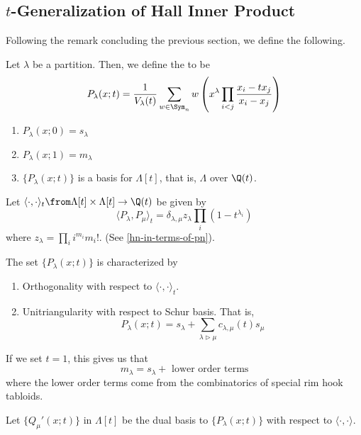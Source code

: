 \documentclass[11pt,leqno,oneside]{amsart}
\numberwithin{thm}{section}
\newcommand{\strictlydominates}{\mathrel{\rhd}}
\newcommand{\sym}{\Lambda}
\begin{document}
\subsection{\(t\)-Generalization of Hall Inner Product}
Following the remark concluding the previous section, we define the
following.
\begin{defn}
  Let \(\lambda\) be a partition. Then, we define the
   to be \[
    P_\lambda(x;t) = \frac{1}{V_\lambda(t)} \sum_{w \in \Sym_n} w
    \left( x^\lambda \prod_{i < j} \frac{x_i-tx_j}{x_i-x_j}\right)
  \]
\end{defn}
\begin{prop}
  \begin{enumerate}
  \item \(P_\lambda(x;0) = s_\lambda\)
  \item \(P_\lambda(x;1) = m_\lambda\)
  \item \(\{P_\lambda(x;t)\}\) is a basis for \(\sym[t]\), that is,
    \(\sym\) over \(\Q(t)\). 
  \end{enumerate}
\end{prop}
\begin{defn}
  Let \(\langle \cdot, \cdot \rangle_t \from \sym[t] \times \sym[t]
  \to \Q(t)\) be given by \[
    \langle P_\lambda, P_\mu \rangle_t = \delta_{\lambda,\mu}
    z_\lambda \prod_{i} (1-t^{\lambda_i})
  \]
  where \(z_\lambda = \prod_i i^{m_i} m_i!\). (See
  \ref{hn-in-terms-of-pn}). 
\end{defn}
\begin{prop}
  The set \(\{P_\lambda(x;t)\}\) is characterized by
  \begin{enumerate}
  \item Orthogonality with respect to \(\langle \cdot, \cdot
    \rangle_t\).
  \item Unitriangularity with respect to Schur basis. That is, \[
      P_\lambda(x;t) = s_\lambda + \sum_{\lambda \strictlydominates
        \mu} c_{\lambda,\mu}(t) s_\mu
    \]
  \end{enumerate}
\end{prop}
\begin{cor}
  If we set \(t=1\), this gives us that \[
    m_\lambda = s_\lambda + \text{ lower order terms}
  \]
  where the lower order terms come from the combinatorics of special
  rim hook tabloids.
\end{cor}
\begin{defn}
  Let \(\{Q_\mu'(x;t)\}\) in \(\sym[t]\) be the dual basis to
  \(\{P_\lambda(x;t)\}\) with respect to \(\langle \cdot,\cdot
  \rangle\). 
\end{defn}
\end{document}
